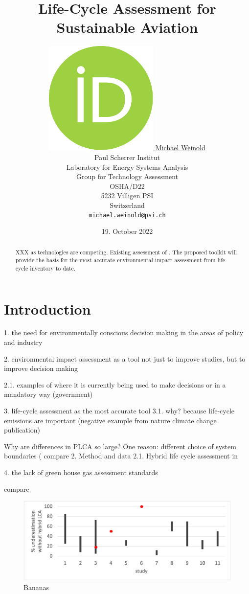 \documentclass{article}
\title{Life-Cycle Assessment for Sustainable Aviation}
\author{
    \href{https://orcid.org/0000-0003-4859-2650}
    {\includegraphics[scale=0.06]{auxiliary/figures/orcid.pdf}
    \hspace{1mm}
    Michael Weinold} \\
	Paul Scherrer Institut\\
	Laboratory for Energy Systems Analysis\\
	Group for Technology Assessment\\
	OSHA/D22\\
    5232 Villigen PSI \\
    Switzerland \\
	\texttt{michael.weinold@psi.ch} \\
}
\date{19. October 2022}
\begin{document}


\maketitle

\begin{abstract}
    XXX as technologies are competing. Existing assessment of 
	\cite{becattini_role_2021}. The proposed toolkit will provide the basis for the most accurate environmental impact assessment from life-cycle inventory to date. 
\end{abstract}

\section{Introduction}

    1. the need for environmentally conscious decision making in the areas of policy and industry
    
    2. environmental impact assessment as a tool not just to improve studies, but to improve decision making
    
        2.1. examples of where it is currently being used to make decisions or in a mandatory way (government)
    
    3. life-cycle assessment as the most accurate tool
        3.1. why? because life-cycle emissions are important (negative example from nature climate change publication)
        
        Why are differences in PLCA so large? One reason: different choice of system boundaries ( compare 2. Method and data 2.1. Hybrid life cycle assessment in \cite{teh_hybrid_2017}
        
    4. the lack of green house gas assessment standards
    
    compare \cite{bourgault_documentation_2021}
        
\begin{figure}[h!]
	\centering
	\includegraphics[width=\textwidth]{figures/underestimation_excel.png}
	\caption{Bananas}
	\label{fig:performance}
\end{figure}
\end{document}
